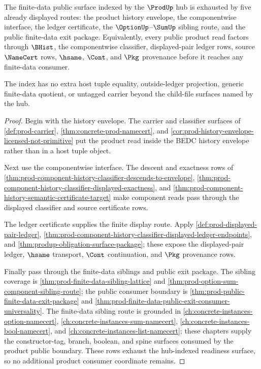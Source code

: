 \begin{theorem}
\label{thm:prod-hub-finite-data-readiness-index}
The finite-data public surface indexed by the $\ProdUp$ hub is exhausted by five already displayed routes: the product history envelope, the componentwise interface, the ledger certificate, the $\OptionUp$--$\SumUp$ sibling route, and the public finite-data exit package. Equivalently, every public product read factors through $\BHist$, the componentwise classifier, displayed-pair ledger rows, source $\NameCert$ rows, $\hsame$, $\Cont$, and $\Pkg$ provenance before it reaches any finite-data consumer.

The index has no extra host tuple equality, outside-ledger projection, generic finite-data quotient, or untagged carrier beyond the child-file surfaces named by the hub.
\end{theorem}
\begin{proof}
Begin with the history envelope. The carrier and classifier surfaces of \autoref{def:prod-carrier}, \autoref{thm:concrete-prod-namecert}, and \autoref{cor:prod-history-envelope-licensed-not-primitive} put the product read inside the BEDC history envelope rather than in a host tuple object.

Next use the componentwise interface. The descent and exactness rows of \autoref{thm:prod-component-history-classifier-descends-to-envelope}, \autoref{thm:prod-component-history-classifier-displayed-exactness}, and \autoref{thm:prod-component-history-semantic-certificate-target} make component reads pass through the displayed classifier and source certificate rows.

The ledger certificate supplies the finite display route. Apply \autoref{def:prod-displayed-pair-ledger}, \autoref{thm:prod-component-history-classifier-displayed-ledger-endpoints}, and \autoref{thm:produp-obligation-surface-package}; these expose the displayed-pair ledger, $\hsame$ transport, $\Cont$ continuation, and $\Pkg$ provenance rows.

Finally pass through the finite-data siblings and public exit package. The sibling coverage is \autoref{thm:prod-finite-data-sibling-lattice} and \autoref{thm:prod-option-sum-component-sibling-route}; the public consumer boundary is \autoref{thm:prod-public-finite-data-exit-package} and \autoref{thm:prod-finite-data-public-exit-consumer-universality}. The finite-data sibling route is grounded in \autoref{ch:concrete-instances-option-namecert}, \autoref{ch:concrete-instances-sum-namecert}, \autoref{ch:concrete-instances-bool-namecert}, and \autoref{ch:concrete-instances-list-namecert}; these chapters supply the constructor-tag, branch, boolean, and spine surfaces consumed by the product public boundary. These rows exhaust the hub-indexed readiness surface, so no additional product consumer coordinate remains.
\end{proof}
